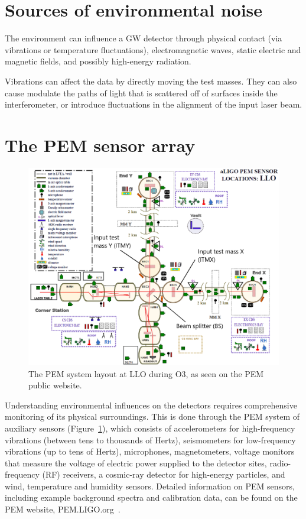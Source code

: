 \section{Sources of environmental noise}

The environment can influence a \ac{GW} detector through physical contact (via vibrations or temperature fluctuations), electromagnetic waves, static electric and magnetic fields, and possibly high-energy radiation.

Vibrations can affect the data by directly moving the test masses.
They can also cause modulate the paths of light that is scattered off of surfaces inside the interferometer, or introduce fluctuations in the alignment of the input laser beam.

\section{The PEM sensor array}

\begin{figure}[h!]
	\centering
	\includegraphics[width=\textwidth]{figures/channels.png}
	\caption{
		The PEM system layout at LLO during O3, as seen on the PEM public website.}
	\label{fig:channels}
\end{figure}

Understanding environmental influences on the detectors requires comprehensive monitoring of its physical surroundings.
This is done through the \ac{PEM} system of auxiliary sensors (Figure~\ref{fig:channels}), which consists of accelerometers for high-frequency vibrations (between tens to thousands of Hertz), seismometers for low-frequency vibrations (up to tens of Hertz), microphones, magnetometers, voltage monitors that measure the voltage of electric power supplied to the detector sites, radio-frequency (RF) receivers, a cosmic-ray detector for high-energy particles, and wind, temperature and humidity sensors.
Detailed information on \ac{PEM} sensors, including example background spectra and calibration data, can be found on the \ac{PEM} website, PEM.LIGO.org~\citep{PEM_website}.

